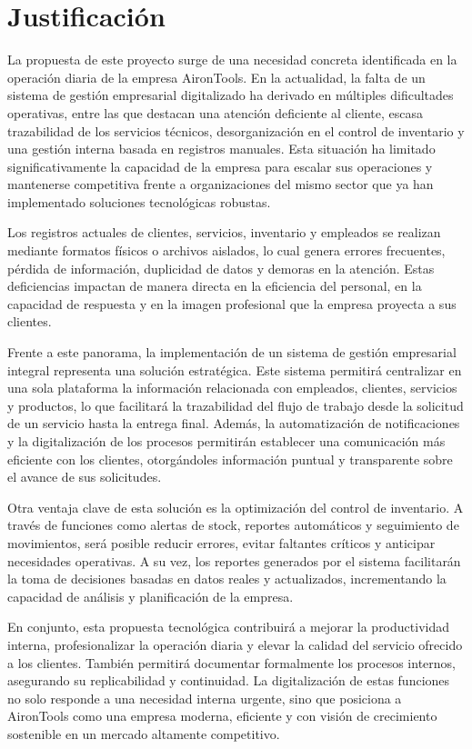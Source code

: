 \section{Justificación}

La propuesta de este proyecto surge de una necesidad concreta identificada en la operación diaria de la empresa AironTools. En la actualidad, la falta de un sistema de gestión empresarial digitalizado ha derivado en múltiples dificultades operativas, entre las que destacan una atención deficiente al cliente, escasa trazabilidad de los servicios técnicos, desorganización en el control de inventario y una gestión interna basada en registros manuales. Esta situación ha limitado significativamente la capacidad de la empresa para escalar sus operaciones y mantenerse competitiva frente a organizaciones del mismo sector que ya han implementado soluciones tecnológicas robustas.

Los registros actuales de clientes, servicios, inventario y empleados se realizan mediante formatos físicos o archivos aislados, lo cual genera errores frecuentes, pérdida de información, duplicidad de datos y demoras en la atención. Estas deficiencias impactan de manera directa en la eficiencia del personal, en la capacidad de respuesta y en la imagen profesional que la empresa proyecta a sus clientes.

Frente a este panorama, la implementación de un sistema de gestión empresarial integral representa una solución estratégica. Este sistema permitirá centralizar en una sola plataforma la información relacionada con empleados, clientes, servicios y productos, lo que facilitará la trazabilidad del flujo de trabajo desde la solicitud de un servicio hasta la entrega final. Además, la automatización de notificaciones y la digitalización de los procesos permitirán establecer una comunicación más eficiente con los clientes, otorgándoles información puntual y transparente sobre el avance de sus solicitudes.

Otra ventaja clave de esta solución es la optimización del control de inventario. A través de funciones como alertas de stock, reportes automáticos y seguimiento de movimientos, será posible reducir errores, evitar faltantes críticos y anticipar necesidades operativas. A su vez, los reportes generados por el sistema facilitarán la toma de decisiones basadas en datos reales y actualizados, incrementando la capacidad de análisis y planificación de la empresa.

En conjunto, esta propuesta tecnológica contribuirá a mejorar la productividad interna, profesionalizar la operación diaria y elevar la calidad del servicio ofrecido a los clientes. También permitirá documentar formalmente los procesos internos, asegurando su replicabilidad y continuidad. La digitalización de estas funciones no solo responde a una necesidad interna urgente, sino que posiciona a AironTools como una empresa moderna, eficiente y con visión de crecimiento sostenible en un mercado altamente competitivo.

